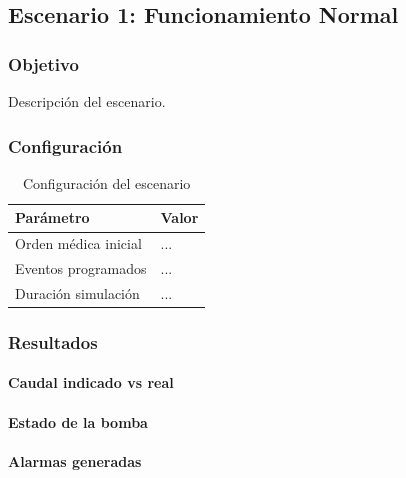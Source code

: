 \subsection{Escenario 1: Funcionamiento Normal}

\subsubsection{Objetivo}

Descripción del escenario.

\subsubsection{Configuración}

\begin{table}[H]
\centering
\begin{tabular}{ll}
\toprule
Parámetro & Valor \\
\midrule
Orden médica inicial & ... \\
Eventos programados & ... \\
Duración simulación & ... \\
\bottomrule
\end{tabular}
\caption{Configuración del escenario}
\end{table}

\subsubsection{Resultados}

\paragraph{Caudal indicado vs real}


\paragraph{Estado de la bomba}



\paragraph{Alarmas generadas}


